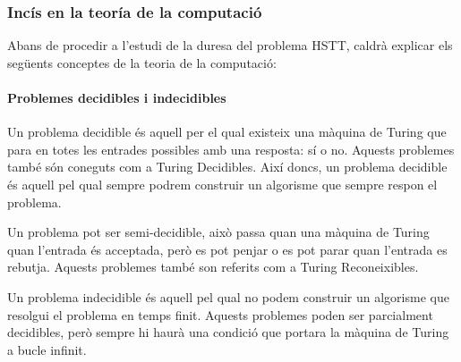 \documentclass[11pt,a4paper,twoside]{report}
\begin{document}
    

    \subsubsection{Incís en la teoría de la computació}
    Abans de procedir a l'estudi de la duresa del problema HSTT, caldrà explicar els següents conceptes de la teoria de la computació: 
    \paragraph*{Problemes decidibles i indecidibles}

    Un problema decidible és aquell per el qual existeix una màquina de Turing que para en totes les entrades possibles amb una resposta: sí o no. Aquests problemes també són coneguts com a Turing Decidibles. 
    Així doncs, un problema decidible és aquell pel qual sempre podrem construir un algorisme que sempre respon el problema.
    
    Un problema pot ser semi-decidible, això passa quan una màquina de Turing quan l'entrada és acceptada, però es pot penjar o es pot parar quan l'entrada es rebutja. Aquests problemes també son referits com a Turing Reconeixibles.
    
    Un problema indecidible és aquell pel qual no podem construir un algorisme que resolgui el problema en temps finit. Aquests problemes poden ser parcialment decidibles, però sempre hi haurà una condició que portara la màquina de Turing a bucle infinit.
\end{document}
